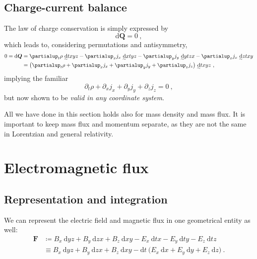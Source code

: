 \documentclass[\ifafour a4paper,12pt,\else a5paper,10pt,\fi%
onecolumn,oneside,article,%
british%
]{memoir}
\theoremstyle{remark}
\theoremstyle{innote}
\newcommand*{\de}{\partialup}%
\newcommand*{\di}{\mathrm{d}}%
\newcommand*{\defd}{\coloneqq}
\renewcommand*{\|}[1][]{\nonscript\:#1\vert\nonscript\:\mathopen{}}
\newcommand*{\eqn}{eq.}%
\newcommand*{\tw}[2][\scriptstyle\sim]{\smash[b]{\underset{\mathclap{{}^{#1}}}{#2}}}
\newcommand*{\ti}[1][\scriptstyle\sim]{\tw[#1]{\di}}
\begin{document}
\subsection{Charge-current balance}
\label{sec:charge_balance}

The law of charge conservation is simply expressed by
\begin{equation}
  \label{eq:charge_conservation}
  \di\bm{Q} = 0 \ ,
\end{equation}
which leads to, considering permutations and antisymmetry,
\begin{equation}
  \label{eq:charge_cons_calculated}
  \begin{split}
0=\di\bm{Q} &= \de_{t}\rho\ \ti txyz 
  -\de_{x}j_{x}\ \ti xtyz
  -\de_{y}j_{y}\ \ti ytzx
  -\de_{x}j_{x}\ \ti ztxy
  \\
  &=\bigl(\de_{t}\rho + \de_{x}j_{x} + \de_{y}j_{y} + \de_{z}j_{z} \bigr)\
  \ti txyz \ ,
\end{split}
\end{equation}
implying the familiar \autocites[\eqn~(1.14)]{kovetz2000}
\begin{equation}
  \label{eq:familiar_charge_cons}
  \de_{t}\rho + \de_{x}j_{x} + \de_{y}j_{y} + \de_{z}j_{z} = 0 \ ,
\end{equation}
but now shown to be \emph{valid in any coordinate system}.

All we have done in this section holds also for mass density and mass flux. It is important to keep mass flux and momentum separate, as they are not the same in Lorentzian and general relativity.

\section{Electromagnetic flux}
\label{sec:electromagnetic_field}

\subsection{Representation and integration}
\label{sec:em_repres}

We can represent the electric field and magnetic flux in one geometrical entity as well:
\begin{equation}
  \label{eq:Faraday}
  \begin{split}
    \bm{F} &\defd
    B_{x}\ \di yz + B_{y}\ \di zx + B_{z}\ \di xy
  - E_{x}\ \di tx - E_{y}\ \di ty - E_{z}\ \di tz
    \\
    &\equiv
    B_{x}\ \di yz + B_{y}\ \di zx + B_{z}\ \di xy -
    \di t\ \bigl(E_{x}\ \di x + E_{y}\ \di y + E_{z}\ \di z \bigr)\ .
\end{split}
\end{equation}
\end{document}
